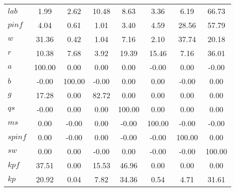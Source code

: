\begin{center}
\begin{longtable}{lccccccc}
$lab      $	 & 	      1.99	 & 	      2.62	 & 	     10.48	 & 	      8.63	 & 	      3.36	 & 	      6.19	 & 	     66.73 \\ 
$pinf     $	 & 	      4.04	 & 	      0.61	 & 	      1.01	 & 	      3.40	 & 	      4.59	 & 	     28.56	 & 	     57.79 \\ 
$w        $	 & 	     31.36	 & 	      0.42	 & 	      1.04	 & 	      7.16	 & 	      2.10	 & 	     37.74	 & 	     20.18 \\ 
$r        $	 & 	     10.38	 & 	      7.68	 & 	      3.92	 & 	     19.39	 & 	     15.46	 & 	      7.16	 & 	     36.01 \\ 
$a        $	 & 	    100.00	 & 	      0.00	 & 	      0.00	 & 	      0.00	 & 	     -0.00	 & 	      0.00	 & 	     -0.00 \\ 
$b        $	 & 	     -0.00	 & 	    100.00	 & 	     -0.00	 & 	      0.00	 & 	      0.00	 & 	     -0.00	 & 	      0.00 \\ 
$g        $	 & 	     17.28	 & 	      0.00	 & 	     82.72	 & 	      0.00	 & 	      0.00	 & 	      0.00	 & 	      0.00 \\ 
$qs       $	 & 	     -0.00	 & 	      0.00	 & 	      0.00	 & 	    100.00	 & 	      0.00	 & 	      0.00	 & 	      0.00 \\ 
$ms       $	 & 	      0.00	 & 	     -0.00	 & 	      0.00	 & 	     -0.00	 & 	    100.00	 & 	     -0.00	 & 	     -0.00 \\ 
$spinf    $	 & 	      0.00	 & 	     -0.00	 & 	      0.00	 & 	     -0.00	 & 	     -0.00	 & 	    100.00	 & 	      0.00 \\ 
$sw       $	 & 	      0.00	 & 	      0.00	 & 	     -0.00	 & 	      0.00	 & 	     -0.00	 & 	     -0.00	 & 	    100.00 \\ 
$kpf      $	 & 	     37.51	 & 	      0.00	 & 	     15.53	 & 	     46.96	 & 	      0.00	 & 	      0.00	 & 	      0.00 \\ 
$kp       $	 & 	     20.92	 & 	      0.04	 & 	      7.82	 & 	     34.36	 & 	      0.54	 & 	      4.71	 & 	     31.61 \\ 
\end{longtable}
 \end{center}
